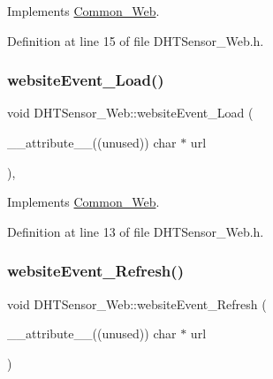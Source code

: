 Implements \hyperlink{class_common___web_a898e3fd8cc6384ecbbbd79c8a3a13b62}{Common\+\_\+\+Web}.



Definition at line 15 of file D\+H\+T\+Sensor\+\_\+\+Web.\+h.

\mbox{\label{class_d_h_t_sensor___web_ab28dae39325e2256be5c0c4505149afe}} 
\subsubsection{\texorpdfstring{website\+Event\+\_\+\+Load()}{websiteEvent\_Load()}}
{\footnotesize\ttfamily void D\+H\+T\+Sensor\+\_\+\+Web\+::website\+Event\+\_\+\+Load (\begin{DoxyParamCaption}\item[{\+\_\+\+\_\+attribute\+\_\+\+\_\+((unused)) char $\ast$}]{url }\end{DoxyParamCaption})\hspace{0.3cm}{\ttfamily [inline]}, {\ttfamily [virtual]}}



Implements \hyperlink{class_common___web_a5ce0d5ce6f63279c3b624371d8a76211}{Common\+\_\+\+Web}.



Definition at line 13 of file D\+H\+T\+Sensor\+\_\+\+Web.\+h.

\mbox{\label{class_d_h_t_sensor___web_ad02a0f5edd3f948ae81f9ebe6032d443}} 
\subsubsection{\texorpdfstring{website\+Event\+\_\+\+Refresh()}{websiteEvent\_Refresh()}}
{\footnotesize\ttfamily void D\+H\+T\+Sensor\+\_\+\+Web\+::website\+Event\+\_\+\+Refresh (\begin{DoxyParamCaption}\item[{\+\_\+\+\_\+attribute\+\_\+\+\_\+((unused)) char $\ast$}]{url }\end{DoxyParamCaption})\hspace{0.3cm}{\ttfamily [virtual]}}



